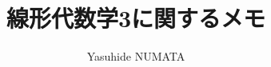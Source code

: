 \documentclass[tombow,dvipdfmx]{jsbook}
\theoremstyle{plain}
\theoremstyle{japanese}
\theoremstyle{remark}
\theoremstyle{japanese}
\theoremstyle{definition}
\theoremstyle{japanese}
\theoremstyle{definition}
\theoremstyle{numberedproof}
\theoremstyle{japanesenumberedproof}
\begin{document}
\title{線形代数学3に関するメモ}

\author{Yasuhide NUMATA}

\maketitle




%

%


%
%

{\printindex}
\end{document}
